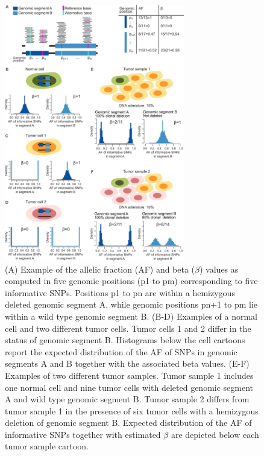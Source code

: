  \begin{figure}[H]
    \caption{(A) Example of the allelic fraction (AF) and beta ($\beta$) values
    as computed in five genomic positions (p1 to pm) corresponding to five
    informative SNPs. Positions p1 to pn are within a hemizygous deleted genomic
    segment A, while genomic positions pn+1 to pm lie within a wild type genomic
    segment B. (B-D) Examples of a normal cell and two different tumor cells.
    Tumor cells 1 and 2 differ in the status of genomic segment B. Histograms
    below the cell cartoons report the expected distribution of the AF of SNPs
    in genomic segments A and B together with the associated beta values. (E-F)
    Examples of two different tumor samples. Tumor sample 1 includes one normal
    cell and nine tumor cells with deleted genomic segment A and wild type
    genomic segment B. Tumor sample 2 differs from tumor sample 1 in the
    presence of six tumor cells with a hemizygous deletion of genomic segment B.
    Expected distribution of the AF of informative SNPs together with estimated
    $\beta$ are depicted below each tumor sample cartoon.}
    \centering
    \includegraphics[width=0.7\textwidth]{image_01.jpg}
  \end{figure}


